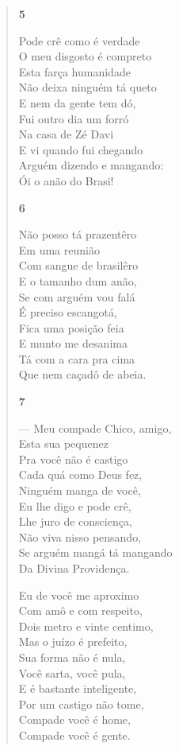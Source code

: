 \begin{verse}
\textbf{5}

Pode crê como é verdade\\
O meu disgosto é compreto\\
 Esta farça humanidade\\
Não deixa ninguém tá queto\\
E nem da gente tem dó,\\
Fui outro dia um forró\\
Na casa de Zé Davi\\
E vi quando fui chegando\\
Arguém dizendo e mangando:\\
Ói o anão do Brasi!

\textbf{6}

Não posso tá prazentêro\\
Em uma reunião\\
Com sangue de brasilêro\\
E o tamanho dum anão,\\
Se com arguém vou falá\\
É preciso escangotá,\\
Fica uma posição feia\\
E munto me desanima\\
Tá com a cara pra cima\\
Que nem caçadô de abeia.

\textbf{7}

--- Meu compade Chico, amigo,\\
Esta sua pequenez\\
Pra você não é castigo\\
Cada quá como Deus fez,\\
Ninguém manga de você,\\
Eu lhe digo e pode crê,\\
Lhe juro de consciença,\\
Não viva nisso pensando,\\
Se arguém mangá tá mangando\\
Da Divina Providença.

Eu de você me aproximo\\
Com amô e com respeito,\\
Dois metro e vinte centimo,\\
Mas o juízo é prefeito,\\
Sua forma não é nula,\\
Você sarta, você pula,\\
E é bastante inteligente,\\
Por um castigo não tome,\\
Compade você é home,\\
Compade você é gente.


\end{verse}
